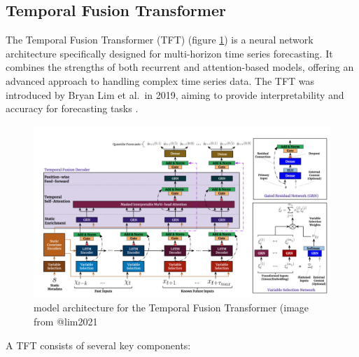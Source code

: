 \documentclass[
]{krantz}
\begin{document}
\subsection{Temporal Fusion Transformer}\label{temporal-fusion-transformer}

The Temporal Fusion Transformer (TFT) (figure \ref{fig:tft}) is a neural network architecture specifically designed for multi-horizon time series forecasting. It combines the strengths of both recurrent and attention-based models, offering an advanced approach to handling complex time series data. The TFT was introduced by Bryan Lim et al.~in 2019, aiming to provide interpretability and accuracy for forecasting tasks \citet{lim2021}.

\begin{figure}

{\centering \includegraphics[width=0.8\linewidth]{work/07-hydroLSTM/images/TFT} 

}

\caption{model architecture for the Temporal Fusion Transformer (image from @lim2021}\label{fig:tft}
\end{figure}

A TFT consists of several key components:
\end{document}
